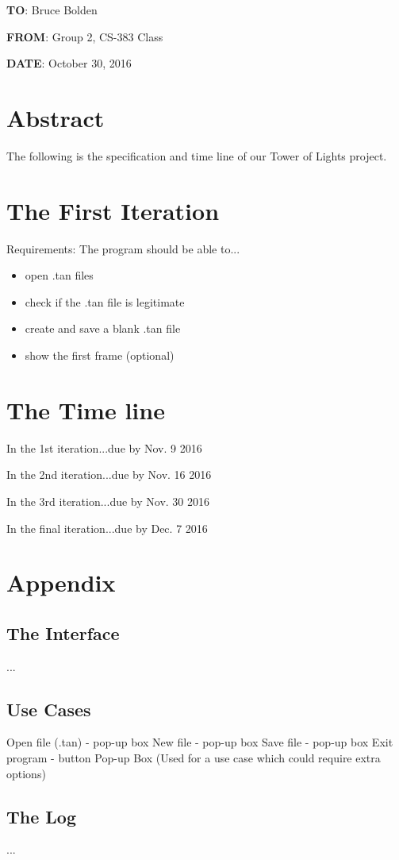 \documentclass[12pt]{article}
\begin{document}
\noindent \textbf{TO}: Bruce Bolden\par 
\noindent
\textbf{FROM}: Group 2, CS-383 Class\par 
\noindent
\textbf{DATE}: October 30, 2016\par 
\noindent
\section*{Abstract}
The following is the specification and time line of our Tower of Lights project.
\section*{The First Iteration}
Requirements: The program should be able to...\begin{itemize}
\item{open .tan files}
\item{check if the .tan file is legitimate}
\item{create and save a blank .tan file}
\item{show the first frame (optional)}
\end{itemize}
\section*{The Time line}
In the 1st iteration...due by Nov. 9 2016\par 
\noindent
In the 2nd iteration...due by Nov. 16 2016\par 
\noindent
In the 3rd iteration...due by Nov. 30 2016\par 
\noindent
In the final iteration...due by Dec. 7 2016\par 
\noindent
\pagebreak
\noindent
\section*{Appendix}
\subsection*{The Interface}
...
\subsection*{Use Cases}
Open file (.tan) - pop-up box
New file - pop-up box
Save file - pop-up box
Exit program - button
Pop-up Box (Used for a use case which could require extra options)
\subsection*{The Log}
...
\end{document}
